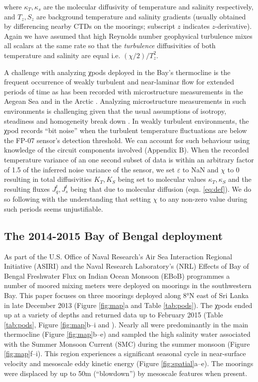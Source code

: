 \documentclass[onecol]{ametsoc}
\begin{document}
where \(κ_T, κ_s\) are the molecular diffusivity of temperature and salinity respectively, and \(T_z, S_z\) are background temperature and salinity gradients (usually obtained by differencing nearby CTDs on the moorings; subscript \(z\) indicates \(z\)-derivative).
Again we have assumed that high Reynolds number geophysical turbulence mixes all scalars at the same rate so that the \emph{turbulence} diffusivities of both temperature and salinity are equal i.e. \((χ/2)/T_z^2\).

A challenge with analyzing χpods deployed in the Bay's thermocline is the frequent occurrence of weakly turbulent and near-laminar flow for extended periods of time as has been recorded with microstructure measurements in the Aegean Sea \citep{Gregg2012} and in the Arctic \citep{Scheifele2018}.
Analyzing microstructure measurements in such environments is challenging given that the usual assumptions of isotropy, steadiness and homogeneity break down \citep{Rohr1988,Itsweire1993,Gargett1984a}.
In weakly turbulent environments, the χpod records ``bit noise'' when the turbulent temperature fluctuations are below the FP-07 sensor's detection threshold.
We can account for such behaviour using knowledge of the  circuit components involved (Appendix B).
When the recorded temperature variance of an one second subset of data is within an arbitrary factor of 1.5 of the inferred noise variance of the sensor, we set \(ε\) to NaN and \(χ\) to 0 resulting in total diffusivities \(K_T, K_S\)  being set to molecular values \(κ_T, κ_S\) and the resulting fluxes \(J_q^t, J_s^t\) being that due to molecular diffusion (eqn. \ref{eq:def}).
We do so following \cite{Gregg2012} with the understanding that setting \(χ\) to any non-zero value during such periods seems unjustifiable.


\subsection{The 2014-2015 Bay of Bengal deployment}
\label{sec:org46e574a}

As part of the U.S. Office of Naval Research's Air Sea Interaction Regional Initiative (ASIRI) and the Naval Research Laboratory's (NRL) Effects of Bay of Bengal Freshwater Flux on Indian Ocean Monsoon (EBoB) programmes a number of moored mixing meters  \citep[χpods,][]{Moum2009a} were deployed on moorings in the southwestern Bay.
This paper focuses on three moorings deployed along 8°N east of Sri Lanka in late December 2013 (Figure \ref{fig:map}a and Table \ref{tab:pods}).
The χpods ended up at a variety of depths and returned data up to February 2015 (Table \ref{tab:pods}, Figure \ref{fig:map}b--i and \citealp{Wijesekera2016a}).
Nearly all were predominantly in the main thermocline (Figure \ref{fig:map}b--e) and sampled the high salinity water associated with the Summer Monsoon Current (SMC) during the summer monsoon (Figure \ref{fig:map}f--i).
This region experiences a significant seasonal cycle in near-surface velocity and mesoscale eddy kinetic energy (Figure \ref{fig:spatial}a--e).
The moorings were displaced by up to 50m (``blowdown'') by mesoscale features when present.
\end{document}
